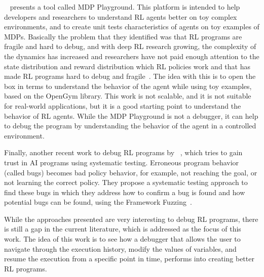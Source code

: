 ~\citet{Rajan_2023} presents a tool 
called \ac{MDP} Playground. This platform is intended to help developers and researchers to understand
\ac{RL} agents better on toy complex environments, and to create unit tests characteristics of agents 
on toy examples of \ac{MDP}s. Basically the problem that they identified was that \ac{RL} programs 
are fragile and hard to debug, and with deep \ac{RL} research growing, the complexity of the 
dynamics has increased and researchers have not paid enough attention to the state distribution and 
reward distribution which \ac{RL} policies work and that has made \ac{RL} programs hard to debug 
and fragile~\cite{Rajan_2023}. The idea with this is to open the box in terms to understand the behavior of the agent 
while using toy examples, based on the OpenGym library. This work is not scalable, and it is not 
suitable for real-world applications, but it is a good starting point to understand the behavior of 
\ac{RL} agents. While the \ac{MDP} Playground is not a debugger, it can help to debug the program by understanding the 
behavior of the agent in a controlled environment.

Finally, another recent work to debug \ac{RL} programs by ~\citet{Steinmetz2021DebuggingAP},
which tries to gain trust in \ac{AI} programs using systematic testing. Erroneous program behavior
(called bugs) becomes bad policy behavior, for example, not reaching the 
goal, or not learning the correct policy. They propose a systematic testing approach to find these 
bugs in which they address how to confirm a bug is found and how potential bugs can be found, 
using the Framework Fuzzing~\cite{Steinmetz2021DebuggingAP}.

While the approaches presented are very interesting to debug \ac{RL} programs, there is still
a gap in the current literature, which is addressed as the focus of this work. The idea 
of this work is to see how 
a debugger that allows the user to navigate through the execution history, modify the values of 
variables, and resume the execution from a specific point in time, performs into creating
better \ac{RL} programs.

\endinput

